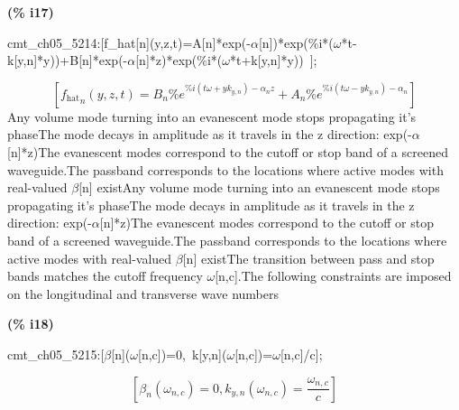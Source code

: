 \documentclass[fleqn]{article}
\begin{document}
\noindent
\begin{minipage}[t]{4.000000em}\color{red}\bfseries
(\% i17)	
\end{minipage}
\begin{minipage}[t]{\textwidth}\color{blue}
cmt\_ch05\_5214:[f\_hat[n](y,z,t)=A[n]*exp(-\ensuremath{\alpha}[n])*exp(\%i*(\ensuremath{\omega}*t-k[y,n]*y))+B[n]*exp(-\ensuremath{\alpha}[n]*z)*exp(\%i*(\ensuremath{\omega}*t+k[y,n]*y))\ ];
\end{minipage}
\[\displaystyle \tag{\% o17} 
\left[ {{{f_{\ensuremath{\mathrm{hat}}}}}_n}\left( y\operatorname{,}z\operatorname{,}t\right) ={B_n} {{\% e}^{\% i \left( t \omega +y {k_{y,n}}\right) -{{\alpha }_n} z}}+{A_n} {{\% e}^{\% i \left( t \omega -y {k_{y,n}}\right) -{{\alpha }_n}}}\right] \mbox{}
\]
Any volume mode turning into an evanescent mode stops propagating it's phaseThe mode decays in amplitude as it travels in the z direction: exp(-\ensuremath{\alpha}[n]*z)The evanescent modes correspond to the cutoff or stop band of a screened waveguide.The passband corresponds to the locations where active modes with real-valued \ensuremath{\beta}[n] existAny volume mode turning into an evanescent mode stops propagating it's phaseThe mode decays in amplitude as it travels in the z direction: exp(-\ensuremath{\alpha}[n]*z)The evanescent modes correspond to the cutoff or stop band of a screened waveguide.The passband corresponds to the locations where active modes with real-valued \ensuremath{\beta}[n] existThe transition between pass and stop bands matches the cutoff frequency \ensuremath{\omega}[n,c].The following constraints are imposed on the longitudinal and transverse wave numbers


\noindent
\begin{minipage}[t]{4.000000em}\color{red}\bfseries
(\% i18)	
\end{minipage}
\begin{minipage}[t]{\textwidth}\color{blue}
cmt\_ch05\_5215:[\ensuremath{\beta}[n](\ensuremath{\omega}[n,c])=0,\ k[y,n](\ensuremath{\omega}[n,c])=\ensuremath{\omega}[n,c]/c];
\end{minipage}
\[\displaystyle \tag{\% o18} 
\left[ {{\beta }_n}\left( {{\omega }_{n,c}}\right) =0\operatorname{,}{k_{y,n}}\left( {{\omega }_{n,c}}\right) =\frac{{{\omega }_{n,c}}}{c}\right] \mbox{}
\]
\end{document}
